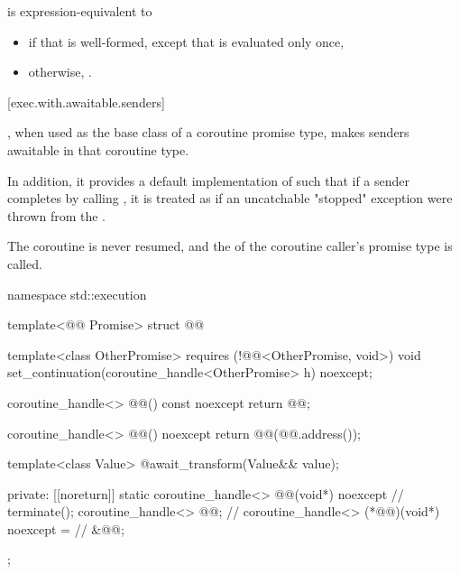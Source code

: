 \pnum
{} is expression-equivalent to
\begin{itemize}
\item
{} if that is well-formed,
except that  is evaluated only once,
\item
otherwise, .
\end{itemize}

[exec.with.awaitable.senders]{}

\pnum
{},
when used as the base class of a coroutine promise type,
makes senders awaitable in that coroutine type.

In addition, it provides a default implementation of 
such that if a sender completes by calling ,
it is treated as if an uncatchable "stopped" exception were thrown
from the .
\begin{note}
The coroutine is never resumed, and
the  of the coroutine caller's promise type is called.
\end{note}

\begin{codeblock}
namespace std::execution {
  template<@@ Promise>
    struct @@ {
      template<class OtherPromise>
        requires (!@@<OtherPromise, void>)
      void set_continuation(coroutine_handle<OtherPromise> h) noexcept;

      coroutine_handle<> @@() const noexcept { return @@; }

      coroutine_handle<> @@() noexcept {
        return @@(@@.address());
      }

      template<class Value>
      @\seebelow@ await_transform(Value&& value);

    private:
      [[noreturn]] static coroutine_handle<>
        @@(void*) noexcept {             // \expos
        terminate();
      }
      coroutine_handle<> @@{};                        // \expos
      coroutine_handle<> (*@@)(void*) noexcept =   // \expos
        &@@;
    };
}
\end{codeblock}

